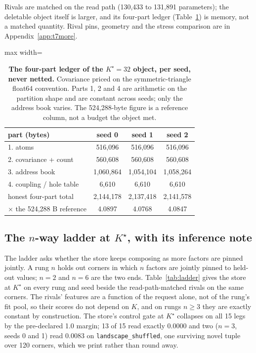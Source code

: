 \documentclass{article}
\newcommand{\Kstar}{\ensuremath{K^{\star}}}
\begin{document}
\noindent Rivals are matched on the read path (130,433 to 131,891 parameters); the deletable object
itself is larger, and its four-part ledger (Table~\ref{tab:ledger-kstar}) is memory, not a matched
quantity. Rival pins, geometry and the stress comparison are in Appendix~\ref{app:t7more}.

\begin{table}[t]
\centering\small
\caption{\textbf{The four-part ledger of the $\Kstar=32$ object, per seed, never netted.}
Covariance priced on the symmetric-triangle float64 convention. Parts 1, 2 and 4 are
arithmetic on the partition shape and are constant across seeds; only the address book varies.
The 524,288-byte figure is a reference column, not a budget the object met.}
\label{tab:ledger-kstar}
\begin{adjustbox}{max width=\linewidth}\begin{tabular}{lccc}
\toprule
part (bytes) & seed 0 & seed 1 & seed 2 \\
\midrule
1. atoms & 516,096 & 516,096 & 516,096 \\
2. covariance + count & 560,608 & 560,608 & 560,608 \\
3. address book & 1,060,864 & 1,054,104 & 1,058,264 \\
4. coupling / hole table & 6,610 & 6,610 & 6,610 \\
honest four-part total & 2,144,178 & 2,137,418 & 2,141,578 \\
$\times$ the 524,288 B reference & 4.0897 & 4.0768 & 4.0847 \\
\bottomrule
\end{tabular}\end{adjustbox}
\end{table}

\subsection{The $n$-way ladder at $\Kstar$, with its inference note}
\label{sec:ladder}

The ladder asks whether the store keeps composing as more factors are pinned jointly. A rung
$n$ holds out corners in which $n$ factors are jointly pinned to held-out values; $n=2$ and
$n=6$ are the two ends. Table~\ref{tab:ladder} gives the store at $\Kstar$ on every rung and
seed beside the read-path-matched rivals on the same corners. The rivals' features are a
function of the request alone, not of the rung's fit pool, so their scores do not depend on
$K$, and on rungs $n\ge3$ they are exactly constant by construction.
The store's control gate at $\Kstar$ collapses on all 15 legs by the pre-declared 1.0 margin;
13 of 15 read exactly 0.0000 and two ($n=3$, seeds 0 and 1) read 0.0083 on
\texttt{landscape\_shuffled}, one surviving novel tuple over 120 corners, which we print
rather than round away.
\end{document}
